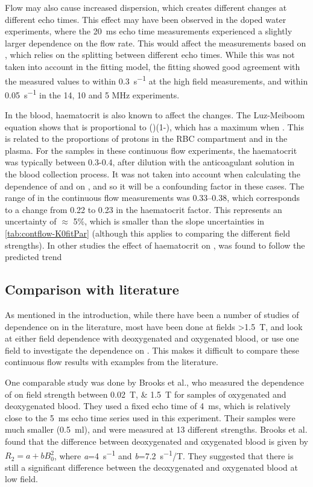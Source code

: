 Flow may also cause increased dispersion, which creates different \Ttwo changes at different echo times.
This effect may have been observed in the doped water experiments, where the \SI{20}{ms} echo time \Ttwo measurements experienced a slightly larger dependence on the flow rate.
This would affect the measurements based on \Kzero, which relies on the splitting between different echo times.
While this was not taken into account in the fitting model, the \Kzero fitting showed good agreement with the measured \Rtwo values to within \SI{0.3}{s^{-1}} at the high field measurements, and within \SI{0.05}{s^{-1}} in the 14, 10 and 5 MHz experiments.

In the blood, haematocrit is also known to affect the \Ttwo changes.
The Luz-Meiboom equation shows that \Kzero is proportional to (\Hct)(1-\Hct), which has a maximum when .
This is related to the proportions of protons in the RBC compartment and in the plasma.
For the samples in these continuous flow experiments, the haematocrit was typically between 0.3-0.4, after dilution with the anticoagulant solution in the blood collection process.
It was not taken into account when calculating the dependence of \Rtwo and \Kzero on \SOtwo, and so it will be a confounding factor in these cases.
The range of \Hct in the continuous flow measurements was \numrange{0.33}{0.38}, which corresponds to a change from \num{0.22} to \num{0.23} in the haematocrit factor.
This represents an uncertainty of $\approx$ 5\%, which is smaller than the slope uncertainties in \autoref{tab:contflow-K0fitPar} (although this applies to comparing the different field strengths).
In other studies the effect of haematocrit on \Ttwo, was found to follow the predicted trend \cite{GolayMeasurementtissueoxygen2001,ZhaoOxygenationhematocritdependence2007,PortnoyRelaxationpropertieshuman2017}


\subsection{Comparison with literature}
\label{sec:contflow-litcomp}
As mentioned in the introduction, while there have been a number of studies of \Ttwo dependence on \SOtwo in the literature, most have been done at fields \SI{>1.5}{T}, and look at either field dependence with deoxygenated and oxygenated blood, or use one field to investigate the dependence on \SOtwo.
This makes it difficult to compare these continuous flow results with examples from the literature.

One comparable study was done by Brooks et al., who measured the dependence of \Ttwo on field strength between \SIlist{0.02;1.5}{T} for samples of oxygenated and deoxygenated blood\cite{BrooksComparisont2relaxation1995}.
They used a fixed echo time of \SI{4}{ms}, which is relatively close to the \SI{5}{ms} echo time series used in this experiment.
Their samples were much smaller (\SI{0.5}{ml}), and were measured at 13 different \Bzero strengths.
Brooks et al. found that the difference between deoxygenated and oxygenated blood is given by $R_2 = a + bB_0^2$, where \textit{a}=\SI{4}{s^{-1}} and \textit{b}=\SI{7.2}{s^{-1}/T}.
They suggested that there is still a significant difference between the deoxygenated and oxygenated blood at low field.

